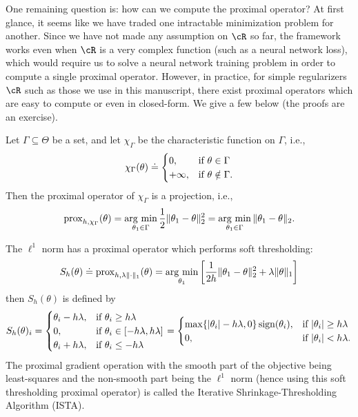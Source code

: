 \documentclass[../../book-main.tex]{subfiles}
\begin{document}
One remaining question is: how can we compute the proximal operator? At first
glance, it seems like we have traded one intractable minimization problem for
another. Since we have not made any assumption on \(\cR\) so far, the framework
works even when \(\cR\) is a very complex function (such as a neural network
loss), which would require us to solve a neural network training problem in
order to compute a single proximal operator. However, in practice, for simple
regularizers \(\cR\) such as those we use in this manuscript, there exist
proximal operators which are easy to compute or even in closed-form. We give
a few below (the proofs are an exercise).

\begin{example}\label{example:prox-of-characteristic-function}
    Let \(\Gamma \subseteq \Theta\) be a set, and let \(\chi_{\Gamma}\) be the characteristic function on \(\Gamma\), i.e.,
    \begin{equation}
        \chi_{\Gamma}(\theta) \doteq \begin{cases}0, & \text{if}\ \theta \in \Gamma \\ +\infty, & \text{if}\ \theta \notin \Gamma.\end{cases}
    \end{equation}
    Then the proximal operator of \(\chi_{\Gamma}\) is a projection, i.e.,
    \begin{equation}
        \prox_{h, \chi_{\Gamma}}(\theta) = \argmin_{\theta_{1} \in \Gamma}\frac{1}{2}\norm{\theta_{1} - \theta}_{2}^{2} = \argmin_{\theta_{1} \in \Gamma}\norm{\theta_{1} - \theta}_{2}.
    \end{equation}
\end{example}

\begin{example}\label{example:prox-of-l1}
    The \(\ell^{1}\) norm has a proximal operator which performs soft thresholding:
    \begin{equation}
        S_{h}(\theta) \doteq \prox_{h, \lambda \norm{\cdot}_{1}}(\theta) = \argmin_{\theta_{1}}\bs{\frac{1}{2h}\norm{\theta_{1} - \theta}_{2}^{2} + \lambda\norm{\theta}_{1}}
    \end{equation}
    then \(S_{h}(\theta)\) is defined by 
    \begin{equation}
        S_{h}(\theta)_{i} = \casework{\theta_{i} - h\lambda, & \text{if}\ \theta_{i} \geq h\lambda \\ 0, & \text{if}\ \theta_{i} \in [-h\lambda, h\lambda] \\ \theta_{i} + h\lambda, & \text{if}\ \theta_{i} \leq -h\lambda} = \casework{\max\{\abs{\theta_{i}} - h\lambda, 0\}\sign(\theta_{i}), & \text{if}\ \abs{\theta_{i}} \geq h\lambda \\ 0, & \text{if}\ \abs{\theta_{i}} < h\lambda.}
    \end{equation}
    The proximal gradient operation with the smooth part of the objective being least-squares and the non-smooth part being the \(\ell^{1}\) norm (hence using this soft thresholding proximal operator) is called the Iterative Shrinkage-Thresholding Algorithm (ISTA).
\end{example}
\end{document}
